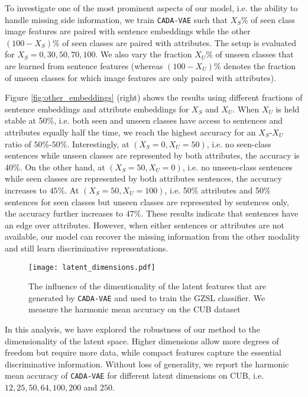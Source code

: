 \documentclass[10pt,twocolumn,letterpaper]{article}
\newcommand{\myparagraph}[1]{\vspace{6pt}\noindent{\bf #1}}
\begin{document}
To investigate one of the most prominent aspects of our model, i.e. the ability to handle missing side information, we train \texttt{CADA-VAE} such that $X_S \%$ of seen class image features are paired with sentence embeddings while the other $(100-X_S)\%$ of seen classes are paired with attributes. The setup is evaluated for $X_S=0,30,50,70,100$.
We also vary the fraction $X_U\%$ of unseen classes that are learned from sentence features (whereas $(100-X_U)\%$ denotes the fraction of unseen classes for which image features are only paired with attributes).


Figure \ref{fig:other_embeddings} (right) shows the results using different fractions of sentence embeddings and attribute embeddings for $X_S$ and $X_U$. When $X_U$ is held stable at 50\%, i.e. both seen and unseen classes have access to sentences and attributes equally half the time, we reach the highest accuracy for an $X_S$-$X_U$ ratio of $50\%$-$50\%$. 
Interestingly, at $(X_S=0,X_U=50)$, i.e. no seen-class sentences while unseen classes are represented by both attributes, the accuracy is $40\%$. On the other hand, at $(X_S=50,X_U=0)$, i.e. no unseen-class sentences while seen classes are represented by both attributes sentences, the accuracy increases to $45\%$. At $(X_S=50,X_U=100)$, i.e. 50\% attributes and 50\% sentences for seen classes but unseen classes are represented by sentences only, the accuracy further increases to $47\%$. 
These results indicate that sentences have an edge over attributes. However, when either sentences or attributes are not available, our model can recover the missing information from the other modality and still learn discriminative representations.

\begin{figure}[t]
\centering
\texttt{[image: latent\_dimensions.pdf]}
\caption{The influence of the dimentionality of the latent features that are generated by \texttt{CADA-VAE} and used to train the GZSL classifier. We measure the harmonic mean accuracy on the CUB dataset}
\label{fig:latent_dimenstions}
\end{figure}




\myparagraph{Increasing Number of Latent Dimensions.}
In this analysis, we have explored the robustness of our method to the dimensionality of the latent space. Higher dimensions allow more degrees of freedom but require more data, while compact features capture the essential discriminative information. Without loss of generality, we report the harmonic mean accuracy of \texttt{CADA-VAE} for different latent dimensions on CUB, i.e. 
$12,25,50,64,100,200$ and $250$.
\end{document}
